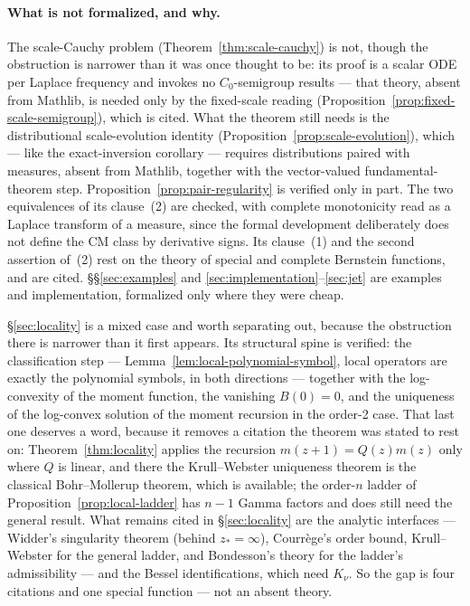 \paragraph{What is not formalized, and why.} The scale-Cauchy problem
(Theorem~\ref{thm:scale-cauchy}) is not, though the obstruction is narrower than it was
once thought to be: its proof is a scalar ODE per Laplace frequency and invokes no
$C_0$-semigroup results --- that theory, absent from Mathlib, is needed only by the
fixed-scale reading (Proposition~\ref{prop:fixed-scale-semigroup}), which is cited. What
the theorem still needs is the distributional scale-evolution identity
(Proposition~\ref{prop:scale-evolution}), which --- like the exact-inversion corollary ---
requires distributions paired with measures, absent from Mathlib, together with the
vector-valued fundamental-theorem step.
Proposition~\ref{prop:pair-regularity} is verified only in part. The two equivalences of
its clause~(2) are checked, with complete monotonicity read as a Laplace transform of a
measure, since the formal development deliberately does not define the CM class by
derivative signs. Its clause~(1) and the second assertion of~(2) rest on the theory of
special and complete Bernstein functions, and are cited.
\S\S\ref{sec:examples} and \ref{sec:implementation}--\ref{sec:jet} are examples and
implementation, formalized only where they were cheap.

\S\ref{sec:locality} is a mixed case and worth separating out, because the obstruction there
is narrower than it first appears. Its structural spine is verified: the classification step
--- Lemma~\ref{lem:local-polynomial-symbol}, local operators are exactly the polynomial
symbols, in both directions --- together with the log-convexity of the moment function, the
vanishing $B(0) = 0$, and the uniqueness of the log-convex solution of the moment recursion
in the order-2 case. That last one deserves a word, because it removes a citation the
theorem was stated to rest on: Theorem~\ref{thm:locality} applies the recursion
$m(z{+}1) = Q(z)m(z)$ only where $Q$ is linear, and there the Krull--Webster uniqueness
theorem is the classical Bohr--Mollerup theorem, which is available; the order-$n$ ladder of
Proposition~\ref{prop:local-ladder} has $n-1$ Gamma factors and does still need the general
result. What remains cited in \S\ref{sec:locality} are the analytic interfaces --- Widder's
singularity theorem (behind $z_* = \infty$), Courrège's order bound, Krull--Webster for the
general ladder, and Bondesson's theory for the ladder's admissibility --- and the Bessel
identifications, which need $K_\nu$. So the gap is four citations and one special function
--- not an absent theory.

